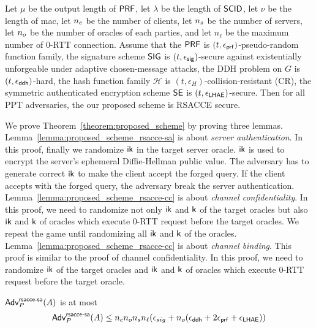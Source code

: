 \begin{theorem} \label{theorem:proposed_scheme}
 Let $\mu$ be the output length of $\mathsf{PRF}$, let $\lambda$ be
 the length of $\mathsf{SCID}$, let $\nu$ be the length of mac, let $n_c$ be the number of
 clients, let $n_s$ be the number of servers, let
 $n_o$ be the number of oracles of each parties, and
 let $n_{\ell}$ be the maximum number of 0-RTT connection. Assume
 that the $\mathsf{PRF}$ is $(t, \epsilon_{\mathsf{prf}})$-pseudo-random
 function family, the signature scheme
 $\mathsf{SIG}$ is $(t, \epsilon_{\mathsf{sig}})$-secure against existentially
 unforgeable under adaptive chosen-message attacks, the DDH
 problem on $G$ is $(t, \epsilon_{\mathsf{ddh}})$-hard, the hash
 function family $\mathcal{H}$ is
 $(t,\epsilon_{H})$-collision-resistant (CR), the symmetric
 authenticated encryption scheme $\mathsf{SE}$ is
 $(t, \epsilon_{\mathsf{LHAE}})$-secure.
 Then for all PPT adversaries, the our proposed scheme is RSACCE secure.
\end{theorem}

We prove Theorem~\ref{theorem:proposed_scheme} by proving three lemmas.
Lemma~\ref{lemma:proposed_scheme_rsacce-sa} is about \textit{server authentication}.
In this proof, finally we randomize $\mathsf{ik}$ in the target server oracle.
$\mathsf{ik}$ is used to encrypt the server's ephemeral Diffie-Hellman public
value. The adversary has to generate correct $\mathsf{ik}$ to make the client accept
the forged query. If the client accepts with the forged query, the adversary
break the server authentication.
Lemma~\ref{lemma:proposed_scheme_rsacce-cc} is about \textit{channel confidentiality}.
In this proof, we need to randomize not only $\mathsf{ik}$ and $\mathsf{k}$ of the target oracles
but also $\mathsf{ik}$ and $\mathsf{k}$ of oracles which execute 0-RTT request before the target
oracles. We repeat the game until randomizing all $\mathsf{ik}$ and $\mathsf{k}$ of the oracles.
Lemma~\ref{lemma:proposed_scheme_rsacce-cc} is about \textit{channel binding}.
This proof is similar to the proof of channel confidentiality. In this proof, we need
to randomize $\mathsf{ik}$ of the target oracles and $\mathsf{ik}$ and $\mathsf{k}$ of oracles which execute
0-RTT request before the target oracle.

\begin{lemma} \label{lemma:proposed_scheme_rsacce-sa}
 $\mathsf{Adv}^{\mathsf{rsacce\textsc{-} sa}}_{P}(A)$ is at most
 \begin{eqnarray}
  \mathsf{Adv}^{\mathsf{rsacce\textsc{-} sa}}_{P}(A) \leq n_c n_o n_s n_{\ell}
  (\epsilon_{sig} + n_o (\epsilon_{\mathsf{ddh}} + 2\epsilon_{\mathsf{prf}} + \epsilon_{\mathsf{LHAE}}))
 \end{eqnarray}
\end{lemma}
%


